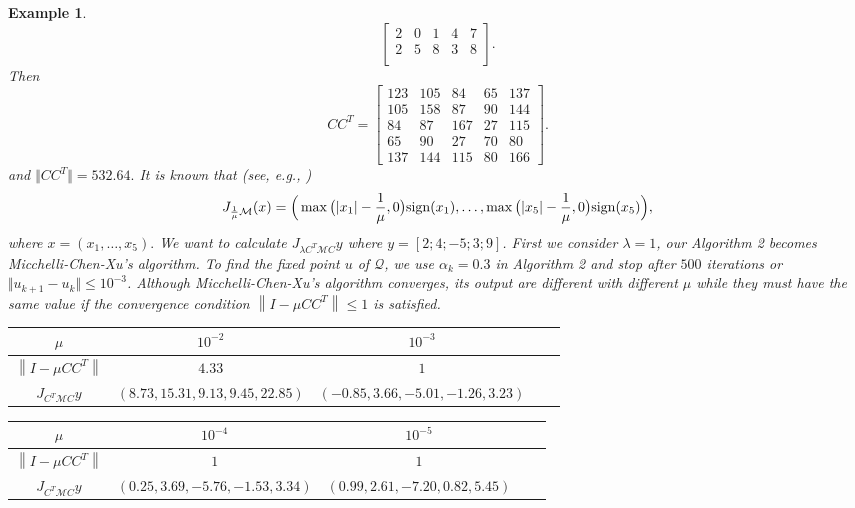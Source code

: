 \documentclass[11pt]{article}
\theoremstyle{plain}
\newtheorem{example}{Example}
\begin{document}
{\begin{example}
$$\begin{bmatrix}
2\;\;\; 0\;\; \;1\;\; \;4 \;\;\;7 \\
2 \;\;\;5\; \;\;8\; \;\;3\; \;\;8 \\
\end{bmatrix}.
$$
Then 
$$
CC^T=\begin{bmatrix}
123& 105 &84&65&137 \\
105  &158 &87  & 90 & 144 \\
 84  & 87 & 167  &27  & 115 \\
 65&  90  & 27&  70&   80 \\
137&144& 115&   80 & 166
\end{bmatrix}.
$$
and $\Vert CC^T\Vert=532.64.$
It is known that (see, e.g., \cite{Micchelli})
$$
J_{{\frac{1}{\mu}} \mathcal{M}}(x)=\Big(\max\big(\vert x_1 \vert-\frac{1}{\mu}, 0\big){ \rm sign}(x_1), \ldots, \max\big(\vert x_5 \vert-\frac{1}{\mu}, 0\big){ \rm sign}(x_5)\Big),
$$
where $x=(x_1,\ldots,x_5).$
We want to calculate $J_{\lambda C^T \mathcal{M} C} y$ where $y=[2; 4; -5; 3; 9]$. First we consider 
 $\lambda=1$, our Algorithm 2 becomes Micchelli-Chen-Xu's algorithm. To find the fixed point $u$ of $\mathcal{Q}$, we use $\alpha_k=0.3$ in  Algorithm 2 and stop after $500$ iterations or $\Vert u_{k+1}-u_k\Vert \le 10^{-3}$. Although Micchelli-Chen-Xu's algorithm converges, its output are different with different $\mu$ while they must have the same value if the convergence condition   $ \left\|I - {}{\mu} CC^T\right\| \le 1$ is satisfied.
 \begin{center}
    \begin{tabular} { | c | c | c | c |  c | }
    \hline
     $\mu$ & $10^{-2}$ &$10^{-3}$ \\
    \hline
  $ \left\|I - {}{\mu} CC^T\right\| $ & $4.33$ &$1$\\
  \hline
    $J_{ C^T \mathcal{M} C} y$ & $( 8.73, 15.31, 9.13, 9.45, 22.85)$&$(-0.85, 3.66, -5.01, -1.26, 3.23)$ \\
    \hline
    \end{tabular}
    \end{center}
     \begin{center}
    \begin{tabular} { | c | c | c | c |  c | }
    \hline
     $\mu$ & $10^{-4}$ &$10^{-5}$ \\
    \hline
  $ \left\|I - {}{\mu} CC^T\right\| $ & $1$ &$1$\\
  \hline
    $J_{ C^T \mathcal{M} C} y$ & $( 0.25, 3.69, -5.76, -1.53, 3.34)$&$(0.99, 2.61, -7.20, 0.82, 5.45)$ \\

\end{tabular}
\end{center}
\end{example}}
\end{document}
